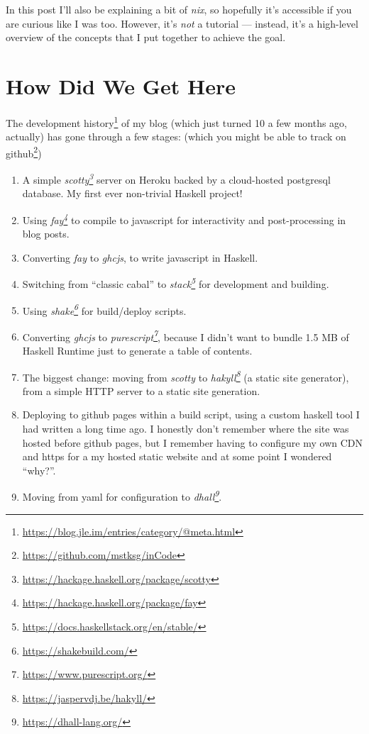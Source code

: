 \documentclass[]{article}
\renewcommand{\href}[2]{#2\footnote{\url{#1}}}
\begin{document}
In this post I'll also be explaining a bit of \emph{nix}, so hopefully it's
accessible if you are curious like I was too. However, it's \emph{not} a
tutorial --- instead, it's a high-level overview of the concepts that I put
together to achieve the goal.

\section{How Did We Get Here}\label{how-did-we-get-here}

The \href{https://blog.jle.im/entries/category/@meta.html}{development history}
of my blog (which just turned 10 a few months ago, actually) has gone through a
few stages: (which you might be able to track
\href{https://github.com/mstksg/inCode}{on github})

\begin{enumerate}
\def\labelenumi{\arabic{enumi}.}
\tightlist
\item
  A simple \emph{\href{https://hackage.haskell.org/package/scotty}{scotty}}
  server on Heroku backed by a cloud-hosted postgresql database. My first ever
  non-trivial Haskell project!
\item
  Using \emph{\href{https://hackage.haskell.org/package/fay}{fay}} to compile to
  javascript for interactivity and post-processing in blog posts.
\item
  Converting \emph{fay} to \emph{ghcjs}, to write javascript in Haskell.
\item
  Switching from ``classic cabal'' to
  \emph{\href{https://docs.haskellstack.org/en/stable/}{stack}} for development
  and building.
\item
  Using \emph{\href{https://shakebuild.com/}{shake}} for build/deploy scripts.
\item
  Converting \emph{ghcjs} to
  \emph{\href{https://www.purescript.org/}{purescript}}, because I didn't want
  to bundle 1.5 MB of Haskell Runtime just to generate a table of contents.
\item
  The biggest change: moving from \emph{scotty} to
  \emph{\href{https://jaspervdj.be/hakyll/}{hakyll}} (a static site generator),
  from a simple HTTP server to a static site generation.
\item
  Deploying to github pages within a build script, using a custom haskell tool I
  had written a long time ago. I honestly don't remember where the site was
  hosted before github pages, but I remember having to configure my own CDN and
  https for a my hosted static website and at some point I wondered ``why?''.
\item
  Moving from yaml for configuration to
  \emph{\href{https://dhall-lang.org/}{dhall}}.
\end{enumerate}
\end{document}
